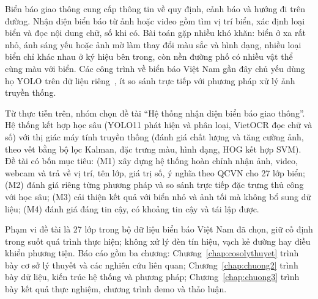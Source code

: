 \label{chap:introduction}

Biển báo giao thông cung cấp thông tin về quy định, cảnh báo và hướng đi trên đường. Nhận diện biển báo từ ảnh hoặc video gồm tìm vị trí biển, xác định loại biển và đọc nội dung chữ, số khi có. Bài toán gặp nhiều khó khăn: biển ở xa rất nhỏ, ánh sáng yếu hoặc ảnh mờ làm thay đổi màu sắc và hình dạng, nhiều loại biển chỉ khác nhau ở ký hiệu bên trong, còn nền đường phố có nhiều vật thể cùng màu với biển. Các công trình về biển báo Việt Nam gần đây chủ yếu dùng họ YOLO trên dữ liệu riêng~\cite{tung2024vietnam,cu2024vietnamese}, ít so sánh trực tiếp với phương pháp xử lý ảnh truyền thống.

Từ thực tiễn trên, nhóm chọn đề tài ``Hệ thống nhận diện biển báo giao thông''. Hệ thống kết hợp học sâu (YOLO11 phát hiện và phân loại, VietOCR đọc chữ và số) với thị giác máy tính truyền thống (đánh giá chất lượng và tăng cường ảnh, theo vết bằng bộ lọc Kalman, đặc trưng màu, hình dạng, HOG kết hợp SVM). Đề tài có bốn mục tiêu: (M1) xây dựng hệ thống hoàn chỉnh nhận ảnh, video, webcam và trả về vị trí, tên lớp, giá trị số, ý nghĩa theo QCVN cho 27 lớp biển; (M2) đánh giá riêng từng phương pháp và so sánh trực tiếp đặc trưng thủ công với học sâu; (M3) cải thiện kết quả với biển nhỏ và ảnh tối mà không bổ sung dữ liệu; (M4) đánh giá đáng tin cậy, có khoảng tin cậy và tái lập được.

Phạm vi đề tài là 27 lớp trong bộ dữ liệu biển báo Việt Nam đã chọn, giữ cố định trong suốt quá trình thực hiện; không xử lý đèn tín hiệu, vạch kẻ đường hay điều khiển phương tiện. Báo cáo gồm ba chương: Chương~\ref{chap:cosolythuyet} trình bày cơ sở lý thuyết và các nghiên cứu liên quan; Chương~\ref{chap:chuong2} trình bày dữ liệu, kiến trúc hệ thống và phương pháp; Chương~\ref{chap:chuong3} trình bày kết quả thực nghiệm, chương trình demo và thảo luận.
